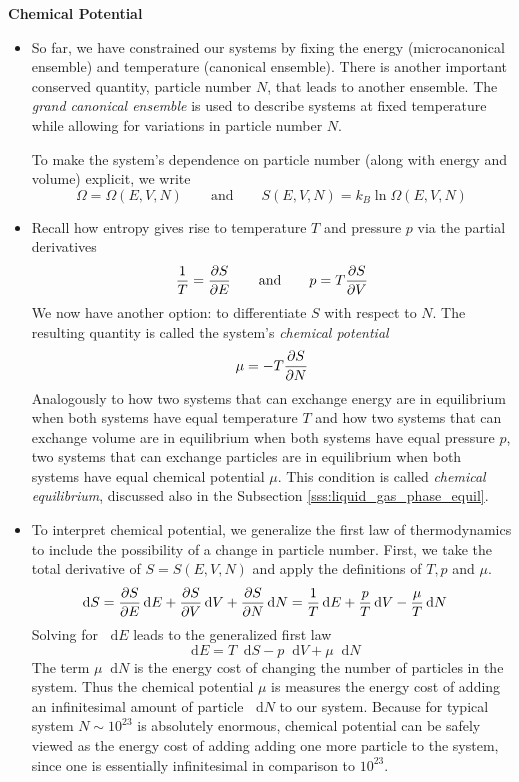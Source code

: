 \documentclass[11pt, a4paper]{article}
\newcommand{\diff}{\mathop{}\!\mathrm{d}} %
\begin{document}
\smallskip
\textbf{Chemical Potential}
\begin{itemize}	
	\item So far, we have constrained our systems by fixing the energy (microcanonical ensemble) and temperature (canonical ensemble). There is another important conserved quantity, particle number $ N $, that leads to another ensemble. The \textit{grand canonical ensemble} is used to describe systems at fixed temperature while allowing for variations in particle number $ N $.
	
	To make the system's dependence on particle number (along with energy and volume) explicit, we write
	\begin{equation*}
		\Omega = \Omega(E, V, N) \qquad \text{and} \qquad S(E, V, N) = k_{B}\ln \Omega(E, V, N)
	\end{equation*}
	
	\item Recall how entropy gives rise to temperature $ T $ and pressure $ p $ via the partial derivatives
	\begin{equation*}
		\frac{1}{T} = \pdv{S}{E} \qquad \text{and} \qquad p = T \pdv{S}{V}
	\end{equation*}
	We now have another option: to differentiate $ S $ with respect to $ N $. The resulting quantity is called the system's \textit{chemical potential}
	\begin{equation*}
		\mu = - T\pdv{S}{N}
	\end{equation*}
	Analogously to how two systems that can exchange energy are in equilibrium when both systems have equal temperature $ T $ and how two systems that can exchange volume are in equilibrium when both systems have equal pressure $ p $, two systems that can exchange particles are in equilibrium when both systems have equal chemical potential $ \mu $. This condition is called \textit{chemical equilibrium}, discussed also in the Subsection \ref{sss:liquid_gas_phase_equil}.
	
	\item To interpret chemical potential, we generalize the first law of thermodynamics to include the possibility of a change in particle number. First, we take the total derivative of $ S = S(E, V, N) $ and apply the definitions of $ T, p $ and $ \mu $.
	\begin{align*}
		\diff S &= \pdv{S}{E}\diff E + \pdv{S}{V}\diff V + \pdv{S}{N}\diff N = \frac{1}{T}\diff E + \frac{p}{T}\diff V - \frac{\mu}{T}\diff N
	\end{align*}
	Solving for $ \diff E $ leads to the generalized first law
	\begin{equation*}
		\diff E = T \diff S - p\diff V + \mu \diff N
	\end{equation*}
	The term $ \mu \diff N $ is the energy cost of changing the number of particles in the system. Thus the chemical potential $ \mu $ is measures the energy cost of adding an infinitesimal amount of particle $ \diff N $ to our system. Because for typical system $ N \sim 10^{23} $ is absolutely enormous, chemical potential can be safely viewed as the energy cost of adding adding one more particle to the system, since one is essentially infinitesimal in comparison to $ 10^{23} $.


\end{itemize}
\end{document}
